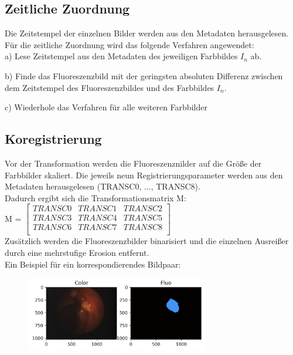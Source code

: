 \documentclass[conference]{IEEEtran}
\begin{document}
\subsection{Zeitliche Zuordnung}
Die Zeitstempel der einzelnen Bilder werden aus den Metadaten herausgelesen. Für die zeitliche Zuordnung wird das folgende Verfahren angewendet: \\

a) Lese Zeitstempel aus den Metadaten des jeweiligen Farbbildes $I_n$ ab.

b) Finde das Fluoreszenzbild mit der geringsten absoluten Differenz zwischen dem Zeitstempel des Fluoreszenzbildes und des Farbbildes $I_n$.

c) Wiederhole das Verfahren für alle weiteren Farbbilder

\subsection{Koregistrierung}
Vor der Transformation werden die Fluoreszenznilder auf die Größe der Farbbilder skaliert.
Die jeweils neun Registrierungsparameter werden aus den Metadaten herausgelesen (TRANSC0, ..., TRANSC8). \\

Dadurch ergibt sich die Transformationsmatrix M: \\

M = 
$\begin{bmatrix}
 TRANSC0 & TRANSC1 & TRANSC2 \\
 TRANSC3 & TRANSC4 & TRANSC5 \\
 TRANSC6 & TRANSC7 & TRANSC8 \\
\end{bmatrix}$ \\

Zusätzlich werden die Fluoreszenzbilder binarisiert und die einzelnen Ausreißer durch eine mehrstufige Erosion entfernt. \\

Ein Beispiel für ein korrespondierendes Bildpaar:

\begin{figure}[h]
\includegraphics[width=8cm]{Fig1}
\end{figure}
\end{document}
